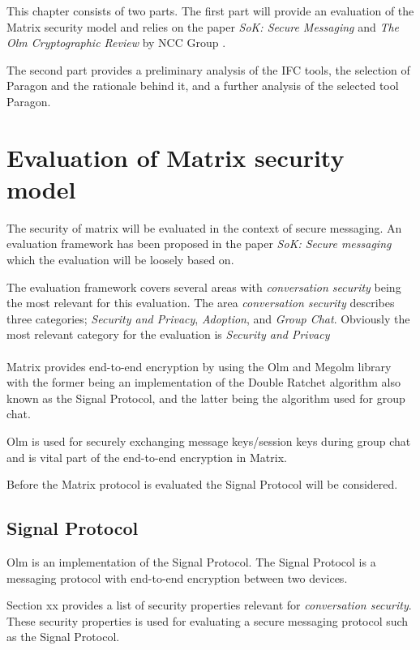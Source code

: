 This chapter consists of two parts. The first part will provide an evaluation of the Matrix security model and relies on the paper \emph{SoK: Secure Messaging} \cite{sok} and \emph{The Olm Cryptographic Review} by NCC Group \cite{ncc}. 

The second part provides a preliminary analysis of the IFC tools, the selection of Paragon and the rationale behind it, and a further analysis of the selected tool Paragon.


\section{Evaluation of Matrix security model}
The security of matrix will be evaluated in the context of secure messaging. An evaluation framework has been proposed in the paper \emph{SoK: Secure messaging} which the evaluation will be loosely based on. 

The evaluation framework covers several areas with \emph{conversation security} being the most relevant for this evaluation. The area \emph{conversation security} describes three categories; \emph{Security and Privacy}, \emph{Adoption}, and \emph{Group Chat}. Obviously the most relevant category for the evaluation is \emph{Security and Privacy}
\\
\\
Matrix provides end-to-end encryption by using the Olm and Megolm library with the former being an implementation of the Double Ratchet algorithm also known as the Signal Protocol, and the latter being the algorithm used for group chat. 

Olm is used for securely exchanging message keys/session keys during group chat and is vital part of the end-to-end encryption in Matrix.

Before the Matrix protocol is evaluated the Signal Protocol will be considered. 


\subsection{Signal Protocol}
Olm is an implementation of the Signal Protocol. The Signal Protocol is a messaging protocol with end-to-end encryption between two devices. 

Section xx provides a list of security properties relevant for \emph{conversation security}. These security properties is used for evaluating a secure messaging protocol such as the Signal Protocol.


